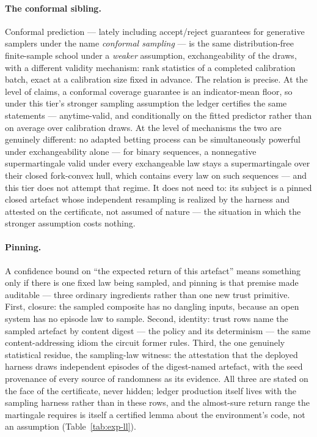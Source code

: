 \paragraph{The conformal sibling.} Conformal prediction
\cite{vovk05} --- lately including accept/reject guarantees for
generative samplers under the name \emph{conformal sampling}
\cite{li25} --- is the same distribution-free finite-sample school
under a \emph{weaker} assumption, exchangeability of the draws, with
a different validity mechanism: rank statistics of a completed
calibration batch, exact at a calibration size fixed in advance. The
relation is precise. At the level of claims, a conformal coverage
guarantee is an indicator-mean floor, so under this tier's stronger
sampling assumption the ledger certifies the same statements ---
anytime-valid, and conditionally on the fitted predictor rather than
on average over calibration draws. At the level of mechanisms the
two are genuinely different: no adapted betting process can be
simultaneously powerful under exchangeability alone --- for binary
sequences, a nonnegative supermartingale valid under every
exchangeable law stays a supermartingale over their closed
fork-convex hull, which contains every law on such sequences
\cite{ramdas21} --- and this tier does not attempt that regime. It does not need to: its
subject is a pinned closed artefact whose independent resampling is
realized by the harness and attested on the certificate, not assumed
of nature --- the situation in which the stronger assumption costs
nothing.

\paragraph{Pinning.} A confidence bound on ``the expected return of
this artefact'' means something only if there is one fixed law being
sampled, and pinning is that premise made auditable --- three
ordinary ingredients rather than one new trust primitive. First,
closure: the sampled composite has no dangling inputs, because an
open system has no episode law to sample. Second, identity: trust
rows name the sampled artefact by content digest --- the policy and
its determinism --- the same content-addressing idiom the circuit
former rules. Third, the one genuinely statistical residue, the
sampling-law witness: the attestation that the deployed harness
draws independent episodes of the digest-named artefact, with the
seed provenance of every source of randomness as its evidence. All
three are stated on the face of the certificate, never hidden;
ledger production itself lives with the sampling harness rather than
in these rows, and the almost-sure return range the martingale
requires is itself a certified lemma about the environment's code,
not an assumption (Table~\ref{tab:exp-ll}).

